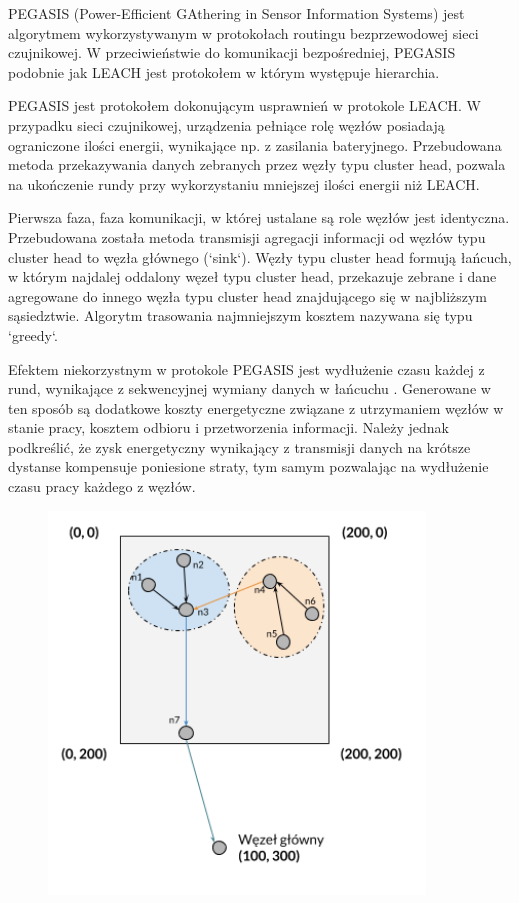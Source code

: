 \documentclass[a4paper,12pt,twoside,openany]{report}
\begin{document}
PEGASIS (Power-Efficient GAthering in Sensor Information Systems) jest algorytmem wykorzystywanym w protokołach routingu bezprzewodowej sieci czujnikowej.
W przeciwieństwie do komunikacji bezpośredniej, PEGASIS podobnie jak LEACH jest protokołem w którym występuje hierarchia.

PEGASIS jest protokołem dokonującym usprawnień w protokole LEACH. W przypadku sieci czujnikowej, urządzenia pełniące rolę węzłów posiadają ograniczone ilości energii, wynikające np. z zasilania bateryjnego.
Przebudowana metoda przekazywania danych zebranych przez węzły typu cluster head, pozwala na ukończenie rundy przy wykorzystaniu mniejszej ilości energii niż LEACH.

Pierwsza faza, faza komunikacji, w której ustalane są role węzłów jest identyczna. Przebudowana została metoda transmisji agregacji informacji od węzłów typu cluster head to węzła głównego (`sink`).
Węzły typu cluster head formują łańcuch, w którym najdalej oddalony węzeł typu cluster head, przekazuje zebrane i dane agregowane do innego węzła typu cluster head znajdującego się w najbliższym 
sąsiedztwie. Algorytm trasowania najmniejszym kosztem nazywana się typu `greedy`. 

Efektem niekorzystnym w protokole PEGASIS jest wydłużenie czasu każdej z rund, wynikające z sekwencyjnej wymiany danych w łańcuchu \cite{Lindsey-Pegasis}.
Generowane w ten sposób są dodatkowe koszty energetyczne związane z utrzymaniem węzłów w stanie pracy, kosztem odbioru i przetworzenia informacji.
Należy jednak podkreślić, że zysk energetyczny wynikający z transmisji danych na krótsze dystanse kompensuje poniesione straty, tym samym pozwalając na wydłużenie czasu pracy każdego z węzłów.

\begin{figure}[H]
 \centering
 \includegraphics[width=10cm]{images/komunikacja_pegasis.png} 
\end{figure}
\end{document}
